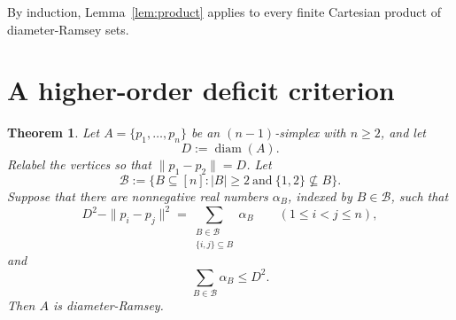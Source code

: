 \documentclass[preprint,12pt]{elsarticle}
\newtheorem{theorem}{Theorem}[section]
\theoremstyle{remark}
\DeclareMathOperator{\diam}{diam}
\begin{document}
By induction, Lemma~\ref{lem:product} applies to every finite Cartesian product of diameter-Ramsey sets.

\section{A higher-order deficit criterion}

\begin{theorem}\label{thm:criterion}
Let $A=\{p_1,\dots,p_n\}$ be an $(n-1)$-simplex with $n\ge 2$, and let
\[
D:=\diam(A).
\]
Relabel the vertices so that $\|p_1-p_2\|=D$. Let
\[
\mathcal B:=\{B\subseteq[n]: |B|\ge 2\ \text{and}\ \{1,2\}\nsubseteq B\}.
\]
Suppose that there are nonnegative real numbers $\alpha_B$, indexed by $B\in\mathcal B$, such that
\begin{equation}\label{eq:deficits}
D^2-\|p_i-p_j\|^2
=
\sum_{\substack{B\in\mathcal B\\ \{i,j\}\subseteq B}}\alpha_B
\qquad (1\le i<j\le n),
\end{equation}
and
\begin{equation}\label{eq:mass}
\sum_{B\in\mathcal B}\alpha_B\le D^2.
\end{equation}
Then $A$ is diameter-Ramsey.
\end{theorem}
\end{document}
